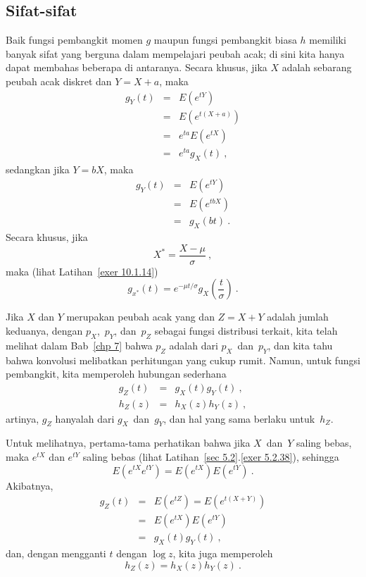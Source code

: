 \subsection*{Sifat-sifat}
Baik fungsi pembangkit momen $g$ maupun fungsi pembangkit biasa
$h$ memiliki banyak sifat yang berguna dalam mempelajari peubah acak; di sini kita
hanya dapat membahas beberapa di antaranya.  Secara khusus, jika $X$ adalah sebarang peubah acak 
diskret dan $Y = X + a$, maka
\begin{eqnarray*}
g_Y(t) &=& E(e^{tY}) \\
       &=& E(e^{t(X + a)}) \\
       &=& e^{ta} E(e^{tX}) \\
       &=& e^{ta} g_X(t)\ ,
\end{eqnarray*}
sedangkan jika $Y = bX$, maka
\begin{eqnarray*}
g_Y(t) &=& E(e^{tY}) \\
       &=& E(e^{tbX}) \\
       &=& g_X(bt)\ .
\end{eqnarray*}
Secara khusus, jika
$$
X^* = \frac{X - \mu}\sigma\ ,
$$
maka (lihat Latihan~\ref{exer 10.1.14})
$$
g_{x^*}(t) = e^{-\mu t/\sigma} g_X\left( \frac t\sigma \right)\ .
$$

Jika $X$ dan $Y$ merupakan peubah acak yang  dan $Z = X + Y$ adalah
jumlah keduanya, dengan $p_X$,~$p_Y$, dan~$p_Z$ sebagai fungsi distribusi terkait, kita
telah melihat dalam Bab~\ref{chp 7} bahwa $p_Z$ adalah  dari
$p_X$~dan~$p_Y$, dan kita tahu bahwa konvolusi melibatkan perhitungan yang cukup
rumit.  Namun, untuk fungsi pembangkit, kita memperoleh hubungan sederhana
\begin{eqnarray*}
g_Z(t) &=& g_X(t) g_Y(t)\ , \\
h_Z(z) &=& h_X(z) h_Y(z)\ ,
\end{eqnarray*}
artinya, $g_Z$ hanyalah  dari $g_X$~dan~$g_Y$, dan hal yang sama
berlaku untuk~$h_Z$.

Untuk melihatnya, pertama-tama perhatikan bahwa jika $X$~dan~$Y$ saling bebas, maka $e^{tX}$ dan
$e^{tY}$ saling bebas (lihat Latihan~\ref{sec 5.2}.\ref{exer 5.2.38}), sehingga
$$
E(e^{tX} e^{tY}) = E(e^{tX}) E(e^{tY})\ .
$$
Akibatnya,
\begin{eqnarray*}
g_Z(t) &=& E(e^{tZ}) = E(e^{t(X + Y)}) \\
       &=& E(e^{tX}) E(e^{tY}) \\
       &=& g_X(t) g_Y(t)\ ,
\end{eqnarray*}
dan, dengan mengganti $t$ dengan $\log z$, kita juga memperoleh
$$
h_Z(z) = h_X(z) h_Y(z)\ .
$$

